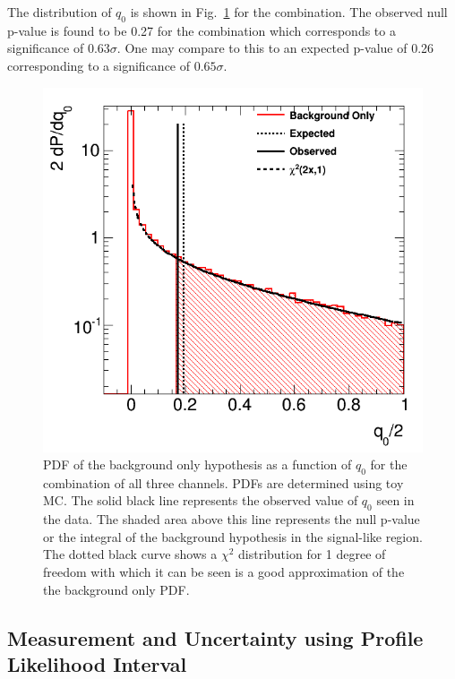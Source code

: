 The distribution of $q_0$ is shown in Fig.~\ref{fig:stat_measurement_significance} for the combination.  
The observed null p-value 
is found to be 0.27 for the combination which corresponds to a significance
of $0.63 \sigma$.  One may compare to this to an expected p-value of 0.26 corresponding to 
a significance of $0.65 \sigma$.

\begin{figure}[ht!]
\centering
\includegraphics[width=0.50\columnwidth]{figures/statistics/significance/combination.png}
\caption{PDF of the background only hypothesis as a function of $q_0$ for the combination of all three channels. PDFs are determined 
using toy MC. The solid black line represents the observed value of $q_0$ seen in the data. The shaded area above
this line represents the null p-value or the 
integral of the background hypothesis in the signal-like region.
The dotted black curve shows a $\chi^2$ distribution for 1 degree of freedom with which 
it can be seen is a good approximation of the 
the background only PDF.}
\label{fig:stat_measurement_significance}
\end{figure}


\subsection{Measurement and Uncertainty using Profile Likelihood Interval}

